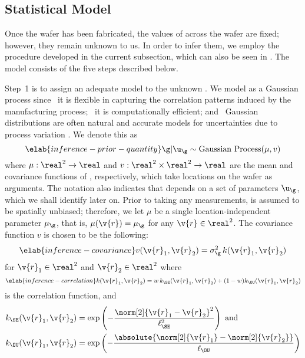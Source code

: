 \subsection{Statistical Model}

Once the wafer has been fabricated, the values of \g across the wafer are fixed;
however, they remain unknown to us. In order to infer them, we employ the
procedure developed in the current subsection, which can also be seen in
. The model consists of the five steps
described below.

Step~1 is to assign an adequate model to the unknown \g. We model \g as a
Gaussian process \cite{rasmussen2006} since \one~it is flexible in capturing the
correlation patterns induced by the manufacturing process; \two~it is
computationally efficient; and \three~Gaussian distributions are often natural
and accurate models for uncertainties due to process variation
\cite{srivastava2010, reda2009, juan2012}. We denote this as
\begin{equation} \elab{inference-prior-quantity}
  \g | \u_\g \sim \mathrm{Gaussian\ Process}(\mu, v)
\end{equation}
where $\mu: \real^2 \to \real$ and $v: \real^2 \times \real^2 \to \real$ are the
mean and covariance functions of \g, respectively, which take locations on the
wafer as arguments. The notation also indicates that \g depends on a set of
parameters $\u_\g$, which we shall identify later on. Prior to taking any
measurements, \g is assumed to be spatially unbiased; therefore, we let $\mu$ be
a single location-independent parameter $\mu_\g$, that is, $\mu(\v{r}) = \mu_\g$
for any $\v{r} \in \real^2$. The covariance function $v$ is chosen to be the
following:
\begin{equation} \elab{inference-covariance}
  v(\v{r}_1, \v{r}_2) = \sigma_\g^2 \, k(\v{r}_1, \v{r}_2)
\end{equation}
for $\v{r}_1 \in \real^2$ and $\v{r}_2 \in \real^2$ where
\begin{equation} \elab{inference-correlation}
  k(\v{r}_1, \v{r}_2) = w \, k_\SE(\v{r}_1, \v{r}_2) + (1 - w) k_\OU(\v{r}_1, \v{r}_2)
\end{equation}
is the correlation function, and
\begin{align*}
  k_\SE(\v{r}_1, \v{r}_2) & = \exp\left(-\frac{\norm[2]{\v{r}_1 - \v{r}_2}^2}{\ell_\SE^2}\right) \text{ and} \\
  k_\OU(\v{r}_1, \v{r}_2) & = \exp\left(-\frac{\absolute{\norm[2]{\v{r}_1} - \norm[2]{\v{r}_2}}}{\ell_\OU}\right)
\end{align*}
